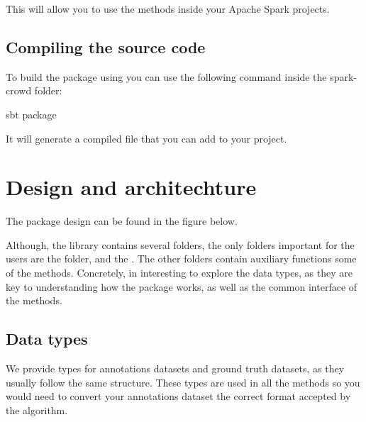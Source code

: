\documentclass[letterpaper,10pt,english]{sphinxmanual}
\begin{document}
This will allow you to use the methods inside your Apache Spark projects.


\section{Compiling the source code}
\label{\detokenize{usage/installation:compiling-the-source-code}}
To build the package using  you can use the following command inside the spark-crowd folder:

%
\begin{sphinxVerbatim}[commandchars=\\\{\}]
sbt package
\end{sphinxVerbatim}

It will generate a compiled  file that you can add to your project.


\chapter{Design and architechture}
\label{\detokenize{package/design:design-and-architechture}}\label{\detokenize{package/design::doc}}
The package design can be found in the figure below.

\noindent{}

Although, the library contains several folders, the only folders important for the users
are the  folder, and the . The other folders contain auxiliary
functions some of the methods. Concretely, in interesting to explore the data types, as
they are key to understanding how the package works, as well as the common interface of
the methods.


\section{Data types}
\label{\detokenize{package/design:data-types}}
We provide types for annotations datasets and ground truth datasets, as they usually follow
the same structure. These types are used in all the methods so you would need to convert
your annotations dataset the correct format accepted by the algorithm.
\end{document}
